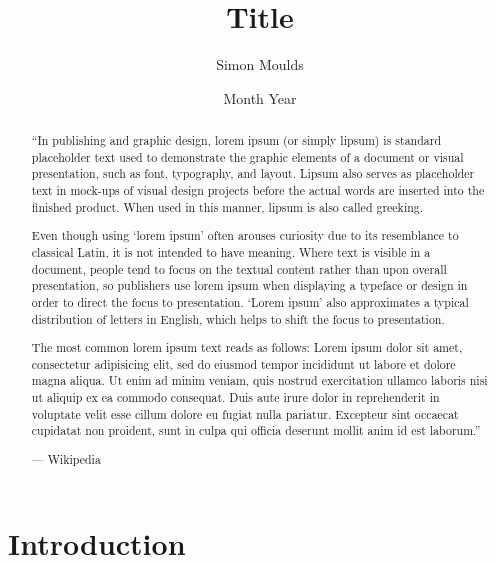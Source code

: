 \documentclass{icldt}\usepackage[]{graphicx}\usepackage[]{color}
\title{Title}
\author{Simon Moulds}
\date{Month Year}
\begin{document}
\maketitle

\begin{abstract}

``In publishing and graphic design, lorem ipsum (or simply lipsum) is standard
placeholder text used to demonstrate the graphic elements of a document or
visual presentation, such as font, typography, and layout. Lipsum also serves as
placeholder text in mock-ups of visual design projects before the actual words
are inserted into the finished product. When used in this manner, lipsum is also
called greeking.

Even though using `lorem ipsum' often arouses curiosity due to its resemblance
to classical Latin, it is not intended to have meaning. Where text is visible in
a document, people tend to focus on the textual content rather than upon overall
presentation, so publishers use lorem ipsum when displaying a typeface or design
in order to direct the focus to presentation. `Lorem ipsum' also approximates a
typical distribution of letters in English, which helps to shift the focus to
presentation.

The most common lorem ipsum text reads as follows: Lorem ipsum dolor sit amet,
consectetur adipisicing elit, sed do eiusmod tempor incididunt ut labore et
dolore magna aliqua. Ut enim ad minim veniam, quis nostrud exercitation ullamco
laboris nisi ut aliquip ex ea commodo consequat. Duis aute irure dolor in
reprehenderit in voluptate velit esse cillum dolore eu fugiat nulla pariatur.
Excepteur sint occaecat cupidatat non proident, sunt in culpa qui officia
deserunt mollit anim id est laborum.''

\hfill --- Wikipedia
\end{abstract}

\makededication

\tableofcontents
\listoftables
\listoffigures




\chapter{Introduction}
\end{document}
